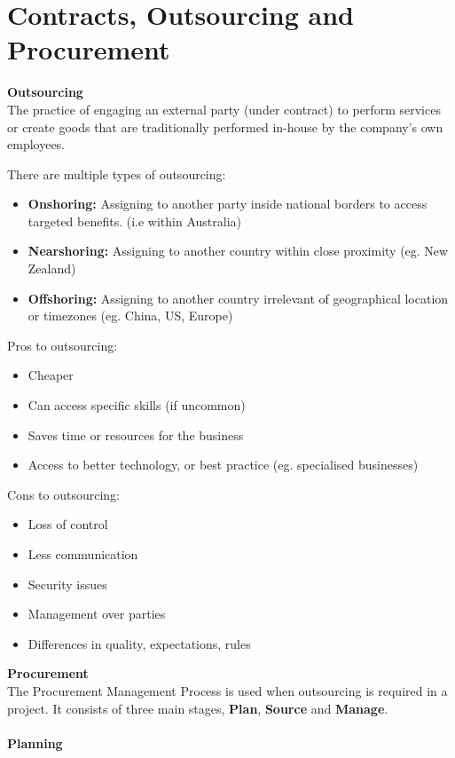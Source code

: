 \documentclass[a4paper,10pt]{article}
\begin{document}
\section*{Contracts, Outsourcing and Procurement}
\begin{shaded}
	\noindent \textcolor{Emerald}{\textbf{Outsourcing}}\\
	The practice of engaging an external party (under contract) to perform services or create goods that are traditionally performed in-house by the company's own employees. 
\end{shaded}
\noindent There are multiple types of outsourcing: 
\begin{itemize}
	\item \textbf{Onshoring:} Assigning to another party inside national borders to access targeted benefits. (i.e within Australia)
	\item \textbf{Nearshoring:} Assigning to another country within close proximity (eg. New Zealand)
	\item \textbf{Offshoring:} Assigning to another country irrelevant of geographical location or timezones (eg. China, US, Europe)
\end{itemize}
Pros to outsourcing: 
\begin{itemize}
	\item Cheaper 
	\item Can access specific skills (if uncommon)
	\item Saves time or resources for the business 
	\item Access to better technology, or best practice (eg. specialised businesses)
\end{itemize}
Cons to outsourcing: 
\begin{itemize}
	\item Loss of control 
	\item Less communication 
	\item Security issues 
	\item Management over parties 
	\item Differences in quality, expectations, rules 
\end{itemize}
\textcolor{BlueGreen}{\textbf{Procurement}} \\
The Procurement Management Process is used when outsourcing is required in a project. It consists of three main stages, \textbf{Plan}, \textbf{Source} and \textbf{Manage}. \\\\
\textcolor{BlueGreen}{\textbf{Planning}} \\
\end{document}
